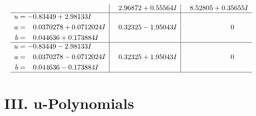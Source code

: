 \documentclass[1p]{elsarticle_modified}
\theoremstyle{definition}
\begin{document}
$$\begin{array}{c|c|c}
 & \phantom{-}2.96872 + 0.55564 I & \phantom{-}8.52805 + 0.35655 I \\ \hline\begin{aligned}
u &= -0.83449 + 2.98133 I \\
a &= \phantom{-}0.0370278 + 0.0712024 I \\
b &= \phantom{-}0.044636 + 0.173884 I\end{aligned}
 & \phantom{-}0.32325 - 1.95043 I & \phantom{-0.000000 } 0 \\ \hline\begin{aligned}
u &= -0.83449 - 2.98133 I \\
a &= \phantom{-}0.0370278 - 0.0712024 I \\
b &= \phantom{-}0.044636 - 0.173884 I\end{aligned}
 & \phantom{-}0.32325 + 1.95043 I & \phantom{-0.000000 } 0\\
 \hline 
 \end{array}$$\newpage
\newpage\renewcommand{\arraystretch}{1}
\centering \section*{ III. u-Polynomials}
\end{document}
